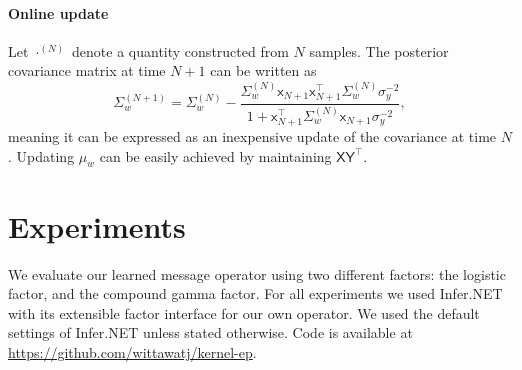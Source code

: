 \documentclass[english]{article}
\theoremstyle{plain}
\theoremstyle{plain}
\newcommand{\feax}{\mathsf{x}}
\newcommand{\feaX}{\mathsf{X}}
\newcommand{\feay}{\mathsf{y}}
\newcommand{\feaY}{\mathsf{Y}}
\newcommand{\wjnote}[1]{ }
\begin{document}
\paragraph{Online update}
Let $\cdot^{(N)}$ denote a quantity constructed from $N$ samples. The posterior
covariance matrix at time $N+1$ can be written as
%
\begin{equation}
\Sigma_{w}^{(N+1)} 
 =
\Sigma_{w}^{(N)}-\frac{\Sigma_{w}^{(N)} \mathsf{x}_{N+1} \mathsf{x}_{N+1}^{\top} \Sigma_{w}^{(N)}\sigma_{y}^{-2}}{1+ \mathsf{x}_{N+1}^{\top}\Sigma_{w}^{(N)} \mathsf{x}_{N+1}\sigma_{y}^{-2}},
\end{equation}
meaning it can be expressed as an inexpensive update of the covariance at time
$N$.
Updating $\mu_{w}$ can be easily achieved by maintaining  $\feaX \feaY^{\top}$. 



\section{Experiments  \label{sec:Experiments}}

We evaluate our learned message operator using two different factors: the
logistic factor, and the compound gamma factor.  For all experiments we used
Infer.NET \citep{Minka2014} with its extensible factor interface for our own
operator.  We used the default settings of Infer.NET unless stated otherwise.  
Code is available at \url{https://github.com/wittawatj/kernel-ep}.
\end{document}
